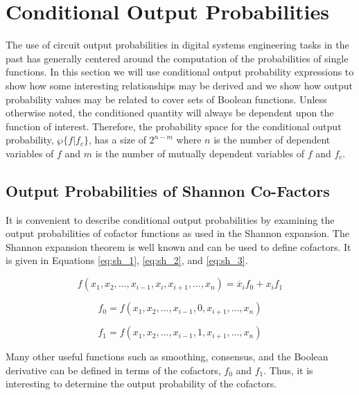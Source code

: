 \section{Conditional Output Probabilities}
The use of circuit output probabilities in digital systems engineering tasks
in the past has generally centered around the computation of the probabilities of single
functions. 
In this section we will use conditional output probability expressions
to show how some interesting relationships may be derived and we show
how output probability values may be related to cover sets of Boolean functions.
Unless otherwise noted, the conditioned quantity will always be dependent
upon the function of interest.  Therefore, the probability space for the
conditional output probability, $\wp \{ f | f_c \}$, has a size of $2^{n-m}$ where
$n$ is the number of dependent variables of $f$ and $m$ is the number of mutually
dependent variables of $f$ and $f_c$.

\subsection{Output Probabilities of Shannon Co-Factors}
It is convenient to describe conditional output probabilities by examining the
output probabilities of cofactor functions as used in the Shannon expansion.
The Shannon expansion theorem is well known and can be used to define cofactors.
It is given in Equations \ref{eq:sh_1}, \ref{eq:sh_2}, and \ref{eq:sh_3}.

\begin{equation}
f(x_1, x_2, \ldots , x_{i-1}, x_i, x_{i+1}, \ldots , x_n) = \overline{x}_i f_0 + x_i f_1 \label{eq:sh_1}
\end{equation}

\begin{equation}
f_0 = f(x_1, x_2, \ldots , x_{i-1}, 0, x_{i+1}, \ldots , x_n) \label{eq:sh_2}
\end{equation}

\begin{equation}
f_1 = f(x_1, x_2, \ldots , x_{i-1}, 1, x_{i+1}, \ldots , x_n) \label{eq:sh_3}
\end{equation}

Many other useful functions such as smoothing, consensus, and the Boolean derivative can
be defined in terms of the cofactors, $f_0$ and $f_1$.  Thus, it is interesting to
determine the output probability of the cofactors.

